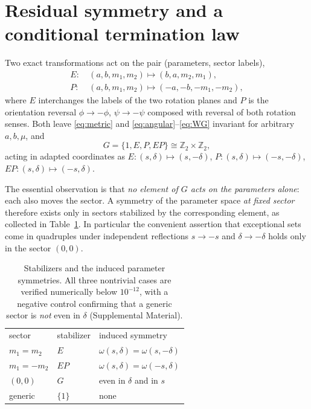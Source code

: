 \documentclass[aps,prd,reprint,superscriptaddress,nofootinbib,longbibliography]{revtex4-2}
\theoremstyle{plain}
\theoremstyle{definition}
\theoremstyle{remark}
\begin{document}
\section{Residual symmetry and a conditional termination law}\label{sec:group}

Two exact transformations act on the pair (parameters, sector labels),
\begin{align}
  E:\ &(a,b,m_1,m_2)\mapsto(b,a,m_2,m_1), \label{eq:Egen}\\
  P:\ &(a,b,m_1,m_2)\mapsto(-a,-b,-m_1,-m_2), \label{eq:Pgen}
\end{align}
where $E$ interchanges the labels of the two rotation planes and $P$ is the
orientation reversal $\phi\to-\phi$, $\psi\to-\psi$ composed with reversal of
both rotation senses. Both leave \eqref{eq:metric} and
\eqref{eq:angular}--\eqref{eq:WG} invariant for arbitrary $a,b,\mu$, and
\begin{equation}\label{eq:klein}
  G=\{1,E,P,EP\}\cong\mathbb{Z}_2\times\mathbb{Z}_2 ,
\end{equation}
acting in adapted coordinates as $E:(s,\delta)\mapsto(s,-\delta)$,
$P:(s,\delta)\mapsto(-s,-\delta)$, $EP:(s,\delta)\mapsto(-s,\delta)$.

The essential observation is that \emph{no element of $G$ acts on the parameters
alone}: each also moves the sector. A symmetry of the parameter space \emph{at
fixed sector} therefore exists only in sectors stabilized by the corresponding
element, as collected in Table~\ref{tab:stabilizers}. In particular the
convenient assertion that exceptional sets come in quadruples under independent
reflections $s\to-s$ and $\delta\to-\delta$ holds only in the sector $(0,0)$.

\begin{table}[b]
\centering
\begin{ruledtabular}
\begin{tabular}{lll}
sector & stabilizer & induced symmetry \\
\colrule
$m_1=m_2$ & $E$ & $\omega(s,\delta)=\omega(s,-\delta)$ \\
$m_1=-m_2$ & $EP$ & $\omega(s,\delta)=\omega(-s,\delta)$ \\
$(0,0)$ & $G$ & even in $\delta$ and in $s$ \\
generic & $\{1\}$ & none \\
\end{tabular}
\end{ruledtabular}
\caption{Stabilizers and the induced parameter symmetries. All three nontrivial
cases are verified numerically below $10^{-12}$, with a negative control
confirming that a generic sector is \emph{not} even in $\delta$ (Supplemental
Material).}
\label{tab:stabilizers}
\end{table}
\end{document}
